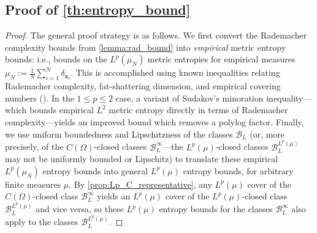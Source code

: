 \documentclass{article}
\def\vx{{\bm{x}}}
\def\cB{{\mathcal{B}}}
\begin{document}
\begin{appendices}
\subsection{Proof of \cref{th:entropy_bound}} \label{appendix:proof_entropy_bound}
\begin{proof}
    The general proof strategy is as follows. We first convert the Rademacher complexity bounds from \cref{lemma:rad_bound} into \textit{empirical} metric entropy bounds: i.e., bounds on the $L^p(\mu_N)$ metric entropies for empirical measures $\mu_N := \frac{1}{N} \sum_{i=1}^N \delta_{\vx_i}$. This is accomplished using known inequalities relating Rademacher complexity, fat-shattering dimension, and empirical covering numbers (\cite{srebro2010smoothness,mendelson2001geometric,alon1997scale}). In the $1 \leq p \leq 2$ case, a variant of Sudakov's minoration inequality---which bounds empirical $L^2$ metric entropy directly in terms of Rademacher complexity---yields an improved bound which removes a polylog factor. Finally, we use uniform boundedness and Lipschitzness of the classes $\cB_L$ (or, more precisely, of the $C(\Omega)$-closed classes $\cB_L^\infty$---the $L^p(\mu)$-closed classes $\cB_L^{L^p(\mu)}$ may not be uniformly bounded or Lipschitz) to translate these empirical $L^p(\mu_N)$ entropy bounds into general $L^p(\mu)$ entropy bounds, for arbitrary finite measures $\mu$. By \cref{prop:Lp_C_representative}, any $L^p(\mu)$ cover of the $C(\Omega)$-closed class $\cB_L^\infty$ yields an $L^p(\mu)$ cover of the $L^p(\mu)$-closed class $\cB_L^{L^p(\mu)}$ and vice versa, so these $L^p(\mu)$ entropy bounds for the classes $\cB_L^\infty$ also apply to the classes $\cB_L^{L^p(\mu)}$.


\end{proof}
\end{appendices}
\end{document}
